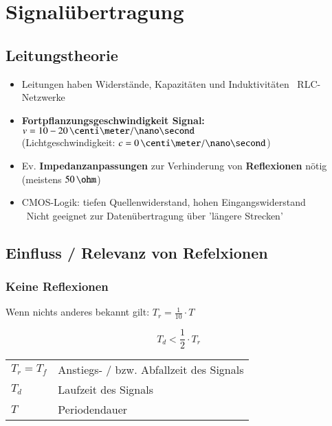 \section{Signalübertragung}

\subsection{Leitungstheorie}

\begin{itemize}
    \item Leitungen haben Widerstände, Kapazitäten und Induktivitäten \textrightarrow\ RLC-Netzwerke
    \item \textbf{Fortpflanzungsgeschwindigkeit Signal:} $v = 10 - 20 \, \centi \meter / \nano \second$ \\
        (Lichtgeschwindigkeit: $c = 0 \, \centi \meter / \nano \second$) %
    \item Ev. \textbf{Impedanzanpassungen} zur Verhinderung von \textbf{Reflexionen} nötig (meistens $50 \, \ohm$)
    \item CMOS-Logik: tiefen Quellenwiderstand, hohen Eingangswiderstand \\
        \textrightarrow\ Nicht geeignet zur Datenübertragung über 'längere Strecken'
\end{itemize}


\subsection{Einfluss / Relevanz von Refelxionen}

\subsubsection{Keine Reflexionen}

Wenn nichts anderes bekannt gilt: $T_r = \frac{1}{10} \cdot T$ 

\begin{minipage}[c]{0.3\columnwidth}
    $$ \boxed{ T_d < \frac{1}{2} \cdot T_r} $$
\end{minipage}
\hfill
\begin{minipage}[c]{0.68\columnwidth}
    \begin{tabular}{ll}
        $T_r = T_f$ & Anstiegs- / bzw. Abfallzeit des Signals \\
        $T_d$       & Laufzeit des Signals \\
        $T$         & Periodendauer
    \end{tabular}
\end{minipage}


